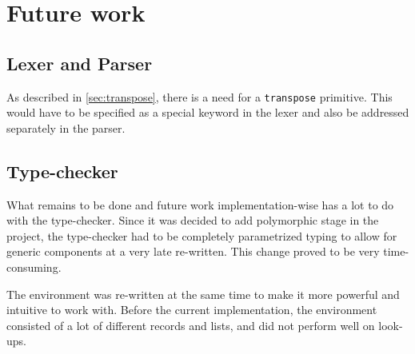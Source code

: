 \section{Future work}
\subsection{Lexer and Parser}
As described in \autoref{sec:transpose}, there is a need for a
\texttt{transpose} primitive. This would have to be specified as a
special keyword in the lexer and also be addressed separately in the
parser.


\subsection{Type-checker}
What remains to be done and future work implementation-wise has a lot
to do with the type-checker. Since it was decided to add polymorphic
stage in the project, the type-checker had to be completely
parametrized typing to allow for generic components at a very late
re-written. This change proved to be very time-consuming.

The environment was re-written at the same time to make it more
powerful and intuitive to work with. Before the current
implementation, the environment consisted of a lot of different
records and lists, and did not perform well on look-ups.
